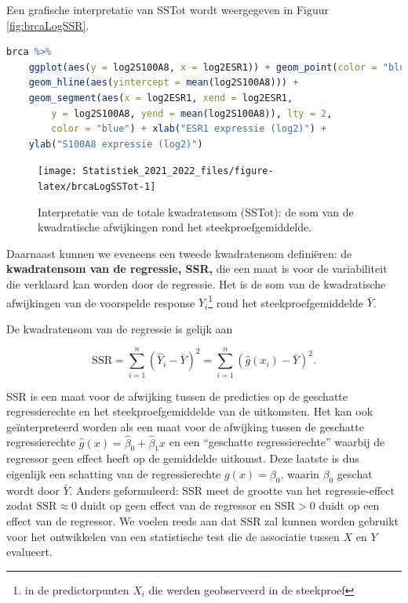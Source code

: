 \documentclass[
  12pt,dutch,coursenotes]{book}
\theoremstyle{definition}
\theoremstyle{definition}
\theoremstyle{definition}
\theoremstyle{definition}
\theoremstyle{remark}
\begin{document}
Een grafische interpretatie van SSTot wordt weergegeven in Figuur \ref{fig:brcaLogSSR}.

\begin{lstlisting}[language=R]
brca %>%
    ggplot(aes(y = log2S100A8, x = log2ESR1)) + geom_point(color = "blue") +
    geom_hline(aes(yintercept = mean(log2S100A8))) +
    geom_segment(aes(x = log2ESR1, xend = log2ESR1,
        y = log2S100A8, yend = mean(log2S100A8)), lty = 2,
        color = "blue") + xlab("ESR1 expressie (log2)") +
    ylab("S100A8 expressie (log2)")
\end{lstlisting}

\begin{figure}

{\centering \texttt{[image: Statistiek\_2021\_2022\_files/figure-latex/brcaLogSSTot-1]} 

}

\caption{Interpretatie van de totale kwadratensom (SSTot): de som van de kwadratische afwijkingen rond het steekproefgemiddelde.}\label{fig:brcaLogSSTot}
\end{figure}

Daarnaast kunnen we eveneens een tweede kwadratensom definiëren: de \textbf{kwadratensom van de regressie, SSR,} die een maat is voor de variabiliteit die verklaard kan worden door de regressie. Het is de som van de kwadratische afwijkingen van de voorspelde response \(\hat{Y}_i\)\footnote{in de predictorpunten \(X_i\) die werden geobserveerd in de steekproef} rond het steekproefgemiddelde \(\bar Y\).

De kwadratensom van de regressie is gelijk aan

\[\text{SSR} = \sum_{i=1}^n (\hat{Y}_i - \bar{Y})^2 = \sum_{i=1}^n (\hat{g}(x_i) - \bar{Y})^2.\]

SSR is een maat voor de afwijking tussen de predicties op de geschatte regressierechte en het steekproefgemiddelde van de uitkomsten.
Het kan ook geïnterpreteerd worden als een maat voor de afwijking tussen de geschatte regressierechte \(\hat{g}(x)=\hat\beta_0+\hat\beta_1x\) en een ``geschatte regressierechte'' waarbij de regressor geen effect heeft op de gemiddelde uitkomst.
Deze laatste is dus eigenlijk een schatting van de regressierechte \(g(x)=\beta_0\), waarin \(\beta_0\) geschat wordt door \(\bar{Y}\).
Anders geformuleerd: SSR meet de grootte van het regressie-effect zodat \(\text{SSR} \approx 0\) duidt op geen effect van de regressor en \(\text{SSR}>0\) duidt op een effect van de regressor. We voelen reeds aan dat \(\text{SSR}\) zal kunnen worden gebruikt voor het ontwikkelen van een statistische test die de associatie tussen \(X\) en \(Y\) evalueert.
\end{document}
